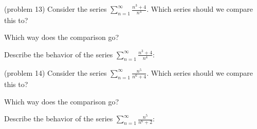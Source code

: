 \documentclass{ximera}
\begin{document}
\begin{problem}(problem 13)
Consider the series $\displaystyle{\sum_{n=1}^\infty \frac{n^3+4}{n^4}}$.
Which series should we compare this to?

\begin{multipleChoice}
\end{multipleChoice}

Which way does the comparison go?
\begin{multipleChoice}
\end{multipleChoice}

Describe the behavior of the series $\sum_{n=1}^\infty \frac{n^3 + 4}{n^4}:$
\begin{multipleChoice}
\end{multipleChoice}

\end{problem}





\begin{problem}(problem 14)
Consider the series $\displaystyle{\sum_{n=1}^\infty \frac{n^5}{n^6 + 4}}$.
Which series should we compare this to?

\begin{multipleChoice}
\end{multipleChoice}

Which way does the comparison go?
\begin{multipleChoice}
\end{multipleChoice}

Describe the behavior of the series $\sum_{n=1}^\infty \frac{n^5}{n^6 + 2}:$
\begin{multipleChoice}
\end{multipleChoice}

\end{problem}
\end{document}

